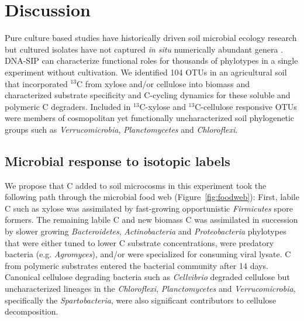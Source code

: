 \section{Discussion} 
Pure culture based studies have historically driven soil microbial ecology
research but cultured isolates have not captured \textit{in situ} numerically
abundant genera \citep{Janssen2006}. DNA-SIP can
characterize functional roles for thousands of phylotypes in a single
experiment without cultivation. We identified 104 OTUs in an agricultural soil
that incorporated $^{13}$C from xylose and/or cellulose into biomass and
characterized substrate specificity and C-cycling dynamics for these soluble
and polymeric C degraders. Included in $^{13}$C-xylose and
$^{13}$C-cellulose responsive OTUs were members of cosmopolitan yet
functionally uncharacterized soil phylogenetic groups such as
\textit{Verrucomicrobia}, \textit{Planctomycetes} and \textit{Chloroflexi}.

\subsection{Microbial response to isotopic labels}
We propose that C added to soil microcosms in this experiment took the
following path through the microbial food web (Figure~\ref{fig:foodweb}):
First, labile C such as xylose was assimilated by fast-growing opportunistic
\textit{Firmicutes} spore formers. The remaining labile C and new biomass C was
assimilated in succession by slower growing \textit{Bacteroidetes},
\textit{Actinobacteria} and \textit{Proteobacteria} phylotypes that were either
tuned to lower C substrate concentrations, were predatory bacteria (e.g.
\textit{Agromyces}), and/or were specialized for consuming viral lysate. C from
polymeric substrates entered the bacterial community after 14 days. Canonical
cellulose degrading bacteria such as \textit{Cellvibrio} degraded cellulose
but uncharacterized lineages in the \textit{Chloroflexi},
\textit{Planctomycetes} and \textit{Verrucomicrobia}, specifically the
\textit{Spartobacteria}, were also significant contributors to cellulose
decomposition. 

